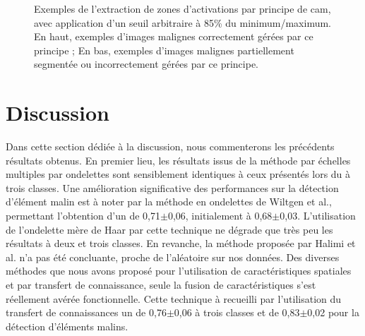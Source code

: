 \begin{figure}[H]
    \caption{Exemples de l'extraction de zones d'activations par principe de \gls{cam}, avec application d'un seuil arbitraire à 85\% du minimum/maximum. En haut, exemples d'images malignes correctement gérées par ce principe ; En bas, exemples d'images malignes partiellement segmentée ou incorrectement gérées par ce principe.}
    \label{fig:example_image_improvement_ft}
\end{figure}\par

\clearpage

\section{Discussion}
Dans cette section dédiée à la discussion, nous commenterons les précédents résultats obtenus. En premier lieu, les résultats issus de la méthode par échelles multiples par ondelettes sont sensiblement identiques à ceux présentés lors du  à trois classes. Une amélioration significative des performances sur la détection d'élément malin est à noter par la méthode en ondelettes de Wiltgen et al., permettant l'obtention d'un \fscore{} de 0,71$\pm$0,06, initialement à 0,68$\pm$0,03. L'utilisation de l'ondelette mère de Haar par cette technique ne dégrade que très peu les résultats à deux et trois classes. En revanche, la méthode proposée par Halimi et al. n'a pas été concluante, proche de l'aléatoire sur nos données. Des diverses méthodes que nous avons proposé pour l'utilisation de caractéristiques spatiales et par transfert de connaissance, seule la fusion de caractéristiques s'est réellement avérée fonctionnelle. Cette technique à recueilli par l'utilisation du transfert de connaissances un \fscore{} de 0,76$\pm$0,06 à trois classes et de 0,83$\pm$0,02 pour la détection d'éléments malins.\par

